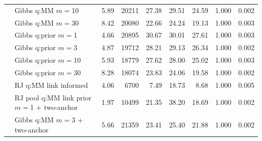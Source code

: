 \begin{tabular}{ll rrrrrrr}
 & Gibbs q:MM $m=$10 & 5.89 & 20211 & 27.38 & 29.51 & 24.59 & 1.000 & 0.002 \\
 & Gibbs q:MM $m=$30 & 8.42 & 20080 & 22.66 & 24.24 & 19.13 & 1.000 & 0.003 \\
 & Gibbs q:prior $m=$1 & 4.66 & 20895 & 30.67 & 30.01 & 27.61 & 1.000 & 0.003 \\
 & Gibbs q:prior $m=$3 & 4.87 & 19712 & 28.21 & 29.13 & 26.34 & 1.000 & 0.002 \\
 & Gibbs q:prior $m=$10 & 5.93 & 18779 & 27.62 & 28.00 & 25.02 & 1.000 & 0.003 \\
 & Gibbs q:prior $m=$30 & 8.28 & 18074 & 23.83 & 24.06 & 19.58 & 1.000 & 0.002 \\
 & RJ q:MM link informed & 4.06 & 6700 & 7.49 & 18.73 & 8.68 & 1.000 & 0.005 \\
 & RJ pool q:MM link prior $m=$1 + two-anchor & 1.97 & 10499 & 21.35 & 38.20 & 18.69 & 1.000 & 0.002 \\
 & Gibbs q:MM $m=$3 + two-anchor & 5.66 & 21359 & 23.41 & 25.40 & 21.88 & 1.000 & 0.002 \\
\bottomrule
\end{tabular}
